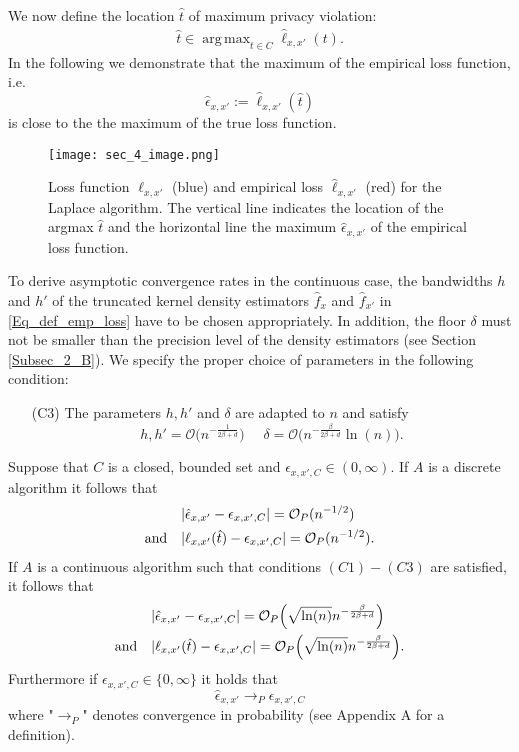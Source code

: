 \documentclass[conference]{IEEEtran}
\DeclareMathOperator*{\argmax}{arg\,max}
\begin{document}
We now define the location $\hat t$ of maximum privacy violation:
\begin{align} \label{Eq_def_hat_t}
\hat{t} \in  \argmax_{t \in C}   \hat{\ell}_{x,x'}(t) .
\end{align}
In the following we demonstrate that the maximum of the empirical loss function, i.e.
\begin{equation} \label{Eq_def_hat_eps}
    \hat \epsilon_{x,x'} := \hat \ell_{x,x'}(\hat t)  
\end{equation}
is close to the the maximum of the true loss function. 

\begin{figure}
\centering
\texttt{[image: sec\_4\_image.png]}\\
\caption{Loss function $\ell_{x,x'}$ (blue) and empirical loss $\hat \ell_{x,x'}$ (red) for the Laplace algorithm. The vertical line indicates the location of the argmax $\hat t$ and the horizontal line the maximum $\hat \epsilon_{x,x'}$ of the empirical loss function.}
\end{figure}
To derive asymptotic convergence rates in the continuous case, the bandwidths $h$ and $h'$ of the truncated kernel density estimators $\hat{f}_x$ and $\hat{f}_{x'}$ in \eqref{Eq_def_emp_loss} have to be chosen appropriately.
In addition, the floor $\delta $ must not  be smaller than the precision level of the density estimators (see Section \ref{Subsec_2_B}). We specify the proper choice of parameters in the following condition: \\

\begin{itemize}
   \item[(C3)] The parameters $h, h'$ and $\delta$ are adapted to $n$ and satisfy
    $$
    h, h'= \mathcal{O}\big(n^{-\frac{1}{2\beta+d}}\big) \,\,\quad \delta = \mathcal{O}\big(n^{-\frac{\beta}{2\beta+d}} \ln(n)\big).
    $$ 
\end{itemize} 

\begin{proposition} \label{proposition_1}
Suppose that $C$ is a closed, bounded set and $\epsilon_{x,x',C}\in (0, \infty)$. If $A$ is a discrete algorithm it follows that
\begin{align*}
& |\hat \epsilon_{x,x'} - \epsilon_{x,x',C}| = \mathcal{O}_P(n^{-1/2})\\
\textnormal{and} \quad & |\ell_{x,x'}(\hat t) - \epsilon_{x,x',C}| = \mathcal{O}_P(n^{-1/2}).
\end{align*}
If $A$ is a continuous algorithm such that conditions $(C1)-(C3)$ are satisfied, it follows that
\begin{align*}
&
|\hat \epsilon_{x,x'}  - \epsilon_{x,x',C}| =  \mathcal{O}_P \Big( \sqrt{\ln(n)} n^{-\frac{\beta}{2\beta+d}}\Big)\\
\textnormal{and} \quad &
|\ell_{x,x'}(\hat t) - \epsilon_{x,x',C}| =  \mathcal{O}_P \Big( \sqrt{\ln(n)} n^{-\frac{\beta}{2\beta+d}}\Big).
\end{align*}
Furthermore if $\epsilon_{x,x',C} \in \{0, \infty\}$ it holds that 
$$
\hat \epsilon_{x,x'} \to_P \epsilon_{x,x',C} 
$$  where "$\to_P$" denotes convergence in probability (see Appendix A for a definition).
\end{proposition}
\end{document}
